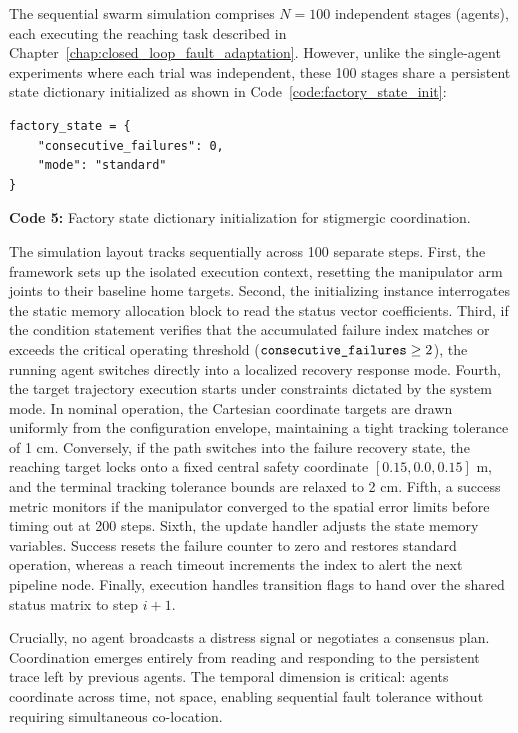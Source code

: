 \documentclass[12pt,a4paper,oneside]{report}
\begin{document}
The sequential swarm simulation comprises $N = 100$ independent stages (agents), each executing the reaching task described in Chapter~\ref{chap:closed_loop_fault_adaptation}. However, unlike the single-agent experiments where each trial was independent, these 100 stages share a persistent state dictionary initialized as shown in Code~\ref{code:factory_state_init}:

\begin{verbatim}
factory_state = {
    "consecutive_failures": 0,
    "mode": "standard"
}
\end{verbatim}
\vspace{0.2cm}
{\small \textbf{Code 5:} Factory state dictionary initialization for stigmergic coordination.\label{code:factory_state_init}}
\vspace{0.3cm}

The simulation layout tracks sequentially across 100 separate steps. First, the framework sets up the isolated execution context, resetting the manipulator arm joints to their baseline home targets. Second, the initializing instance interrogates the static memory allocation block to read the status vector coefficients. Third, if the condition statement verifies that the accumulated failure index matches or exceeds the critical operating threshold ($\text{\texttt{consecutive\_failures}} \ge 2$), the running agent switches directly into a localized recovery response mode. Fourth, the target trajectory execution starts under constraints dictated by the system mode. In nominal operation, the Cartesian coordinate targets are drawn uniformly from the configuration envelope, maintaining a tight tracking tolerance of 1 cm. Conversely, if the path switches into the failure recovery state, the reaching target locks onto a fixed central safety coordinate $[0.15, 0.0, 0.15]$ m, and the terminal tracking tolerance bounds are relaxed to 2 cm. Fifth, a success metric monitors if the manipulator converged to the spatial error limits before timing out at 200 steps. Sixth, the update handler adjusts the state memory variables. Success resets the failure counter to zero and restores standard operation, whereas a reach timeout increments the index to alert the next pipeline node. Finally, execution handles transition flags to hand over the shared status matrix to step $i+1$.

Crucially, no agent broadcasts a distress signal or negotiates a consensus plan. Coordination emerges entirely from reading and responding to the persistent trace left by previous agents. The temporal dimension is critical: agents coordinate across time, not space, enabling sequential fault tolerance without requiring simultaneous co-location.
\end{document}
